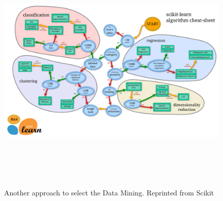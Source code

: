 \begin{figure}[H]
	\includegraphics[width=\columnwidth,height=12cm]{figures/scikitlearn.png}
	\centering
	\caption{Another approach to select the Data Mining. Reprinted from Scikit}
	\label{fig:scikit}
\end{figure}


